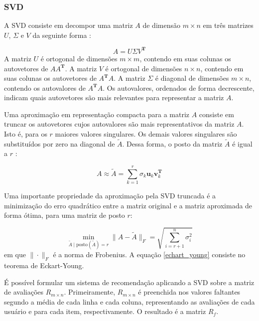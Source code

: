 \subsubsection{SVD}

A SVD consiste em decompor uma matriz $A$ de dimensão $m \times n$ em três
matrizes $U$, $\Sigma$ e $V$ da seguinte forma \cite{strang2006linear}:

\begin{equation}
    A = U \Sigma V^{\mathbf{T}}
\end{equation}
A matriz $U$ é ortogonal de dimensões $m \times m$, contendo em suas colunas
os autovetores de $AA^{\mathbf{T}}$. A matriz $V$ é ortogonal de dimensões $n
\times n$, contendo em suas colunas os autovetores de $A^{\mathbf{T}}A$. A
matriz $\Sigma$ é diagonal de dimensões $m \times n$, contendo os  autovalores
de $A^{\mathbf{T}}A$. Os autovalores, ordenados de forma decrescente, indicam
quais autovetores são mais relevantes para representar a matriz $A$.

Uma aproximação em representação compacta para a matriz $A$ consiste em truncar
os autovetores cujos autovalores são mais representativos da matriz $A$. Isto é,
para os $r$ maiores valores singulares. Os demais valores singulares são
substituídos por zero na diagonal de $\tilde{A}$. Dessa forma, o posto da matriz
$\tilde{A}$ é igual a $r$ \cite{brunton2022data}:

\begin{equation}
    A \approx \tilde{A} = \sum_{k=1}^{r}\sigma_k \mathbf{u}_k \mathbf{v}_k^{\mathbf{T}}
\end{equation}

Uma importante propriedade da aproximação pela SVD truncada é a minimização do
erro quadrático entre a matriz original e a matriz aproximada de forma ótima,
para uma matriz de posto $r$:

\begin{equation} \label{echart_young}
    \min_{\tilde{A} \mid \text{posto}(\tilde{A}) = r } \|A - \tilde{A}\|_F = \sqrt{\sum_{i=r+1}^{n}\sigma_i^2}
\end{equation}
em que $\| \cdot \|_F$ é a norma de Frobenius. A equação \ref{echart_young}
consiste no teorema de Eckart-Young.


É possível formular um sistema de recomendação aplicando a SVD sobre a matriz de
avaliações $R_{m \times n}$. Primeiramente, $R_{m \times n}$ é preenchida nos
valores faltantes segundo a média de cada linha e cada coluna, representando as
avaliações de cada usuário e para cada item, respectivamente. O resultado é a
matriz $R_f$.

